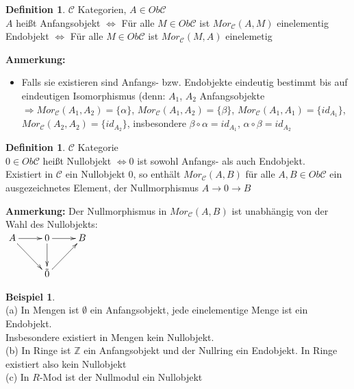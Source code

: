 \documentclass[10pt,a4paper,numbers=endperiod]{scrreprt}
\theoremstyle{definition}
\newtheorem{defi}[satz]{Definition}
\newtheorem{bsp}[satz]{Beispiel}
\def\ZZ{{\mathbb Z}}
\begin{document}
\begin{defi}
	$\mathcal{C}$ Kategorien, $A \in Ob \mathcal{C}$\\
	$A$ heißt Anfangsobjekt $\Leftrightarrow$ Für alle $M \in Ob \mathcal{C}$ ist $Mor_\mathcal{C} (A, M)$ einelementig\\
	\hspace*{25mm} Endobjekt $\Leftrightarrow$ Für alle $M \in Ob \mathcal{C}$ ist $Mor_\mathcal{C} (M, A)$ einelemetig
\end{defi}

\textbf{Anmerkung:} \begin{itemize}
	\item Falls sie existieren sind Anfangs- bzw. Endobjekte eindeutig bestimmt bis auf eindeutigen Isomorphismus (denn: $A_1$, $A_2$ Anfangsobjekte $\Rightarrow Mor_\mathcal{C} (A_1, A_2) = \{\alpha\}$, $Mor_\mathcal{C} (A_1, A_2) = \{\beta\}$, $Mor_\mathcal{C} (A_1, A_1) = \{id_{A_1}\}$, $Mor_\mathcal{C} (A_2, A_2) = \{id_{A_2}\}$, insbesondere $\beta \circ \alpha = id_{A_1}$, $\alpha \circ \beta = id_{A_2}$
\end{itemize}

\begin{defi}
	$\mathcal{C}$ Kategorie\\
	$0 \in Ob \mathcal{C}$ heißt Nullobjekt $\Leftrightarrow 0$ ist sowohl Anfangs- als auch Endobjekt.\\
	Existiert in $\mathcal{C}$ ein Nullobjekt $0$, so enthält $Mor_\mathcal{C} (A, B)$ für alle $A, B \in Ob \mathcal{C}$ ein ausgezeichnetes Element, der Nullmorphismus $A \to 0 \to B$
\end{defi}

\textbf{Anmerkung:} Der Nullmorphismus in $Mor_\mathcal{C} (A, B)$ ist unabhängig von der Wahl des Nullobjekts:\\
$\begin{xy}
\xymatrix{
	A \ar[r] \ar[dr]    &   0 \ar[r] \ar[d]  & B \\
	 & \tilde{0} \ar[ur] & 
}
\end{xy}$ 

\begin{bsp}
	$ $\\
	(a) In Mengen ist $\emptyset$ ein Anfangsobjekt, jede einelementige Menge ist ein Endobjekt.\\
	Insbesondere existiert in Mengen kein Nullobjekt.\\
	(b) In Ringe ist $\ZZ$ ein Anfangsobjekt und der Nullring ein Endobjekt. In Ringe existiert also kein Nullobjekt\\
	(c) In $R$-Mod ist der Nullmodul ein Nullobjekt
\end{bsp}
\end{document}
